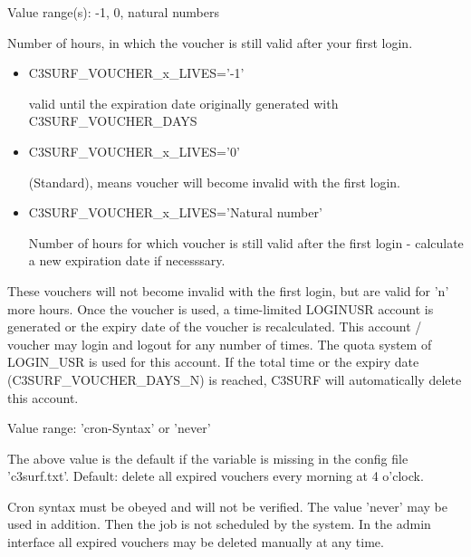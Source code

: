 \begin{description}



   Value range(s): -1, 0, natural numbers

   Number of hours, in which the voucher is still valid after your first login.


\begin{itemize}
   \item{C3SURF\_VOUCHER\_x\_LIVES='-1'}

         valid until the expiration date originally generated with C3SURF\_VOUCHER\_DAYS
   \item{C3SURF\_VOUCHER\_x\_LIVES='0'}

         (Standard), means voucher will become invalid with the first login.
    \item{C3SURF\_VOUCHER\_x\_LIVES='Natural number'}

	  Number of hours for which voucher is still valid after the first login - calculate a new
          expiration date if necesssary.
\end{itemize}
\parskip 12pt

  These vouchers will not become invalid with the first login, but are valid for 'n' more hours. Once the voucher
  is used, a time-limited LOGINUSR account is generated or the expiry date of the voucher is recalculated.
  This account / voucher may login and logout for any number of times. The quota system of LOGIN\_USR is used for
  this account. If the total time or the expiry date (C3SURF\_VOUCHER\_DAYS\_N) is reached, C3SURF
  will automatically delete this account.



  Value range: 'cron-Syntax' or 'never'

  The above value is the default if the variable is missing in the config file 'c3surf.txt'.
  Default: delete all expired vouchers every morning at 4 o'clock.

  Cron syntax must be obeyed and will not be verified. The value 'never' may be used in addition.
  Then the job is not scheduled by the system. In the admin interface all expired vouchers may be
  deleted manually at any time.


\end{description}
